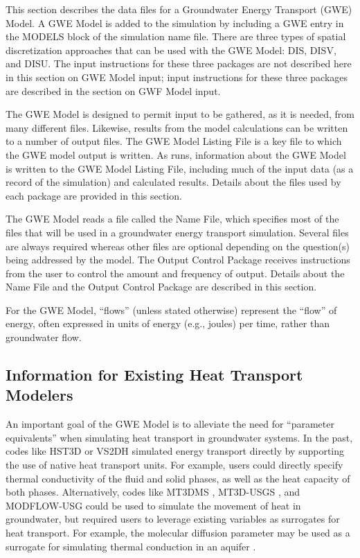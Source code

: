 This section describes the data files for a \mf Groundwater Energy Transport (GWE) Model.  A GWE Model is added to the simulation by including a GWE entry in the MODELS block of the simulation name file.  There are three types of spatial discretization approaches that can be used with the GWE Model: DIS, DISV, and DISU.  The input instructions for these three packages are not described here in this section on GWE Model input; input instructions for these three packages are described in the section on GWF Model input.

The GWE Model is designed to permit input to be gathered, as it is needed, from many different files.  Likewise, results from the model calculations can be written to a number of output files. The GWE Model Listing File is a key file to which the GWE model output is written.  As \mf runs, information about the GWE Model is written to the GWE Model Listing File, including much of the input data (as a record of the simulation) and calculated results.  Details about the files used by each package are provided in this section.

The GWE Model reads a file called the Name File, which specifies most of the files that will be used in a groundwater energy transport simulation. Several files are always required whereas other files are optional depending on the question(s) being addressed by the model. The Output Control Package receives instructions from the user to control the amount and frequency of output.  Details about the Name File and the Output Control Package are described in this section.

For the GWE Model, ``flows'' (unless stated otherwise) represent the ``flow'' of energy, often expressed in units of energy (e.g., joules) per time, rather than groundwater flow.  

\subsection{Information for Existing Heat Transport Modelers}
An important goal of the \mf GWE Model is to alleviate the need for ``parameter equivalents'' when simulating heat transport in groundwater systems.  In the past, codes like HST3D \citep{kipp1987} or VS2DH \citep{healy1996} simulated energy transport directly by supporting the use of native heat transport units.  For example, users could directly specify thermal conductivity of the fluid and solid phases, as well as the heat capacity of both phases.  Alternatively, codes like MT3DMS \citep{zheng1999mt3dms}, MT3D-USGS \citep{mt3dusgs}, and MODFLOW-USG \citep{modflowusg} could be used to simulate the movement of heat in groundwater, but required users to leverage existing variables as surrogates for heat transport.  For example, the molecular diffusion parameter may be used as a surrogate for simulating thermal conduction in an aquifer \citep{mazheng2010, hechtmendez}. 

